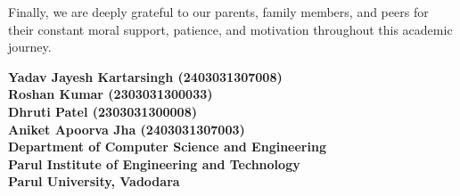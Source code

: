 \vspace{3mm}
\noindent
Finally, we are deeply grateful to our parents, family members, and peers for their constant moral support, patience, and motivation throughout this academic journey.

\vspace{1.5cm}
\begin{flushright}
\textbf{Yadav Jayesh Kartarsingh (2403031307008) \\
Roshan Kumar (2303031300033) \\
Dhruti Patel (2303031300008) \\
Aniket Apoorva Jha (2403031307003) \\
\vspace{2mm}
Department of Computer Science and Engineering\\
Parul Institute of Engineering and Technology\\
Parul University, Vadodara}\\ 
\end{flushright}
\newpage
\cleardoublepage
